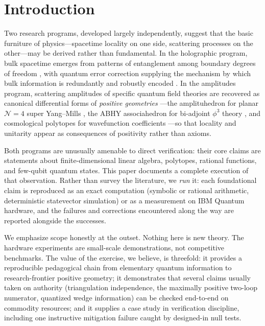 \documentclass[11pt]{article}
\newcommand{\N}{\mathcal{N}}
\begin{document}
\section{Introduction}

Two research programs, developed largely independently, suggest that the
basic furniture of physics---spacetime locality on one side, scattering
processes on the other---may be derived rather than fundamental. In the
holographic program, bulk spacetime emerges from patterns of entanglement
among boundary degrees of freedom \citep{Maldacena:1997re,Ryu:2006bv,
VanRaamsdonk:2010pw,Swingle:2009bg}, with quantum error correction
supplying the mechanism by which bulk information is redundantly and
robustly encoded \citep{Almheiri:2014lwa,Pastawski:2015qua}. In the
amplitudes program, scattering amplitudes of specific quantum field
theories are recovered as canonical differential forms of \emph{positive
geometries} \citep{ArkaniHamed:2017tmz}---the amplituhedron for planar
$\N=4$ super Yang--Mills \citep{ArkaniHamed:2013jha,ArkaniHamed:2013kca},
the ABHY associahedron for bi-adjoint $\phi^3$ theory
\citep{ArkaniHamed:2017mur}, and cosmological polytopes for wavefunction
coefficients \citep{ArkaniHamed:2017fdk}---so that locality and unitarity
appear as consequences of positivity rather than axioms.

Both programs are unusually amenable to direct verification: their core
claims are statements about finite-dimensional linear algebra, polytopes,
rational functions, and few-qubit quantum states. This paper documents a
complete execution of that observation. Rather than survey the
literature, we \emph{run} it: each foundational claim is reproduced as an
exact computation (symbolic or rational arithmetic, deterministic
statevector simulation) or as a measurement on IBM Quantum hardware, and
the failures and corrections encountered along the way are reported
alongside the successes.

We emphasize scope honestly at the outset. Nothing here is new theory.
The hardware experiments are small-scale demonstrations, not competitive
benchmarks. The value of the exercise, we believe, is threefold: it
provides a reproducible pedagogical chain from elementary quantum
information to research-frontier positive geometry; it demonstrates that
several claims usually taken on authority (triangulation independence,
the maximally positive two-loop numerator, quantized wedge information)
can be checked end-to-end on commodity resources; and it supplies a
case study in verification discipline, including one instructive
mitigation failure caught by designed-in null tests.
\end{document}
